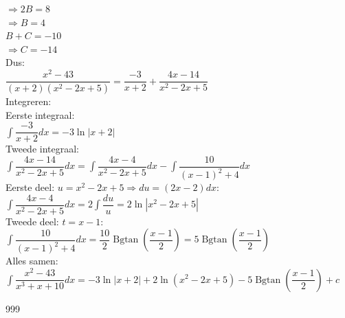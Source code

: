 \documentclass[a4paper]{article}
\begin{document}
$\Rightarrow 2B = 8$\\

$\Rightarrow B = 4$\\

$B+C = -10$\\

$ \Rightarrow C = -14$\\

Dus:\\

$\dfrac{x^2-43}{(x+2)(x^2-2x+5)} = \dfrac{-3}{x+2} + \dfrac{4x-14}{x^2-2x+5}$\\

Integreren:\\

Eerste integraal:\\

$\displaystyle\int \dfrac{-3}{x+2}dx = -3\ln|x+2|$\\

Tweede integraal:\\

$\displaystyle\int \dfrac{4x-14}{x^2-2x+5}dx = \displaystyle\int \dfrac{4x-4}{x^2-2x+5}dx - \displaystyle\int \dfrac{10}{(x-1)^2+4}dx$\\

Eerste deel: $u = x^2-2x+5 \Rightarrow du = (2x-2)dx$:\\

$\displaystyle\int \dfrac{4x-4}{x^2-2x+5}dx = 2\displaystyle\int \dfrac{du}{u} = 2\ln|x^2-2x+5|$\\

Tweede deel: $t = x-1$:\\

$\displaystyle\int \dfrac{10}{(x-1)^2+4}dx = \dfrac{10}{2}\operatorname{Bgtan}\left(\dfrac{x-1}{2}\right) = 5\operatorname{Bgtan}\left(\dfrac{x-1}{2}\right)$\\

Alles samen:\\

$\displaystyle\int \dfrac{x^2-43}{x^3+x+10}dx = -3\ln|x+2| + 2\ln(x^2-2x+5) - 5\operatorname{Bgtan}\left(\dfrac{x-1}{2}\right) + c$




\begin{thebibliography}{999}
\end{thebibliography}
\end{document}
